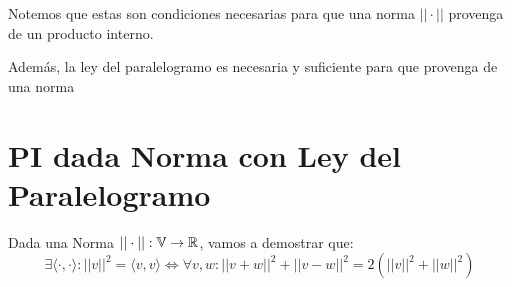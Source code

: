 \documentclass{article}
\begin{document}
Notemos que estas son condiciones necesarias para que una norma $|| \cdot ||$ provenga de un producto interno.

Además, la ley del paralelogramo es necesaria y suficiente para que provenga de una norma

\section*{PI dada Norma con Ley del Paralelogramo}
Dada una Norma $|| \cdot || : \mathbb{V} \to \mathbb{R}$, vamos a demostrar que:
\[
	\exists \langle \cdot , \cdot \rangle : ||v||^2 = \langle v, v \rangle \iff \forall v, w : ||v+w||^2 + ||v-w||^2 = 2(||v||^2 + ||w||^2)
\]
\end{document}
